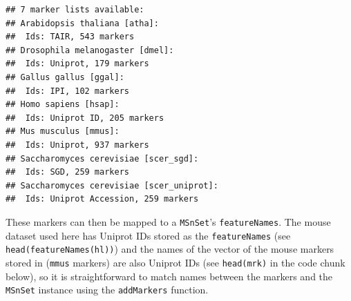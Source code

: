 \begin{knitrout}
\color{fgcolor}\begin{kframe}
\begin{alltt}
\hlstd{()}
\end{alltt}
\begin{verbatim}
## 7 marker lists available:
## Arabidopsis thaliana [atha]:
##  Ids: TAIR, 543 markers
## Drosophila melanogaster [dmel]:
##  Ids: Uniprot, 179 markers
## Gallus gallus [ggal]:
##  Ids: IPI, 102 markers
## Homo sapiens [hsap]:
##  Ids: Uniprot ID, 205 markers
## Mus musculus [mmus]:
##  Ids: Uniprot, 937 markers
## Saccharomyces cerevisiae [scer_sgd]:
##  Ids: SGD, 259 markers
## Saccharomyces cerevisiae [scer_uniprot]:
##  Ids: Uniprot Accession, 259 markers
\end{verbatim}
\end{kframe}
\end{knitrout}

These markers can then be mapped to a \texttt{MSnSet}'s \texttt{featureNames}. The
mouse dataset used here has Uniprot IDs stored as the \texttt{featureNames}
(see \texttt{head(featureNames(hl))}) and the names of the vector of
the mouse markers stored in  (\texttt{mmus} markers) 
are also Uniprot IDs (see \texttt{head(mrk)} in the code chunk below), so 
it is straightforward to match names between the markers and 
the \texttt{MSnSet} instance using the \texttt{addMarkers} function.


